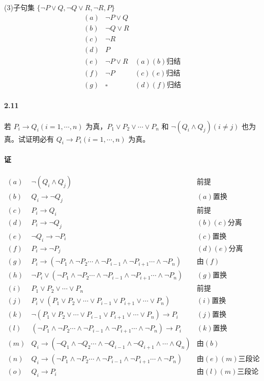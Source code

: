 \documentclass[hyperref, UTF8]{ctexart}
\newcommand{\zhyou}{\text{由}}
\newcommand{\zhfenli}{\text{分离}}
\newcommand{\zhqianti}{\text{前提}}
\newcommand{\zhzhihuan}{\text{置换}}
\begin{document}
(3)子句集 $ \{  \lnot P \lor Q, \lnot Q \lor R, \lnot R, P \} $
\begin{align*}
(a) & \lnot P \lor Q \\
(b) & \lnot Q \lor R \\
(c) & \lnot R \\
(d) & P \\
(e) & \lnot P \lor R & (a)(b)\text{归结} \\
(f) & \lnot P & (c)(e)\text{归结} \\
(g) & \square & (d)(f)\text{归结} 
\end{align*}

\paragraph{2.11}\label{2.11}
若 $ P_i \rightarrow Q_i(i=1, \cdots, n) $ 为真，$ P_1 \lor P_2 \lor \cdots \lor P_n $ 和 $  \lnot (Q_i \land Q_j) (i \neq j) $ 也为真。试证明必有 $ Q_i \rightarrow P_i (i=1, \cdots, n) $ 为真。

\paragraph{证}
\begin{align*}
(a) & \lnot (Q_i \land Q_j) & \zhqianti \\
(b) & Q_i \to \lnot Q_j & (a)\zhzhihuan \\
(c) & P_i \to Q_i & \zhqianti \\ 
(d) & P_i \to \lnot Q_j & (b)(c)\zhfenli \\
(e) & \lnot Q_i \to \lnot P_i & (c)\zhzhihuan \\
(f) & P_i \to \lnot P_j & (d)(e)\zhfenli \\
(g) & P_i \to (\lnot P_1 \land \lnot P_2 \cdots \land \lnot P_{i-1} \land \lnot P_{i+1} \cdots \land \lnot P_n) & \zhyou (f) \\
(h) & \lnot P_i \lor (\lnot P_1 \land \lnot P_2 \cdots \land \lnot P_{i-1} \land \lnot P_{i+1} \cdots \land \lnot P_n) & (g)\zhzhihuan \\
(i) & P_1 \lor P_2 \lor \cdots \lor P_n & \zhqianti \\
(j) & P_i \lor (P_1 \lor P_2 \lor \cdots \lor P_{i-1} \lor P_{i+1} \lor \cdots \lor P_n) & (i)\zhzhihuan \\
(k) & \lnot (P_1 \lor P_2 \lor \cdots \lor P_{i-1} \lor P_{i+1} \lor \cdots \lor P_n) \to P_i & (j)\zhzhihuan \\
(l) & (\lnot P_1 \land \lnot P_2 \cdots \land \lnot P_{i-1} \land \lnot P_{i+1} \cdots \land \lnot P_n) \to P_i & (k)\zhzhihuan \\
(m) & Q_i \to (\lnot Q_1 \land \lnot Q_2 \cdots \land \lnot Q_{i-1} \land \lnot Q_{i+1} \land \cdots \land Q_n) & \zhyou (b) \\
(n) & Q_i \to (\lnot P_1 \land \lnot P_2 \cdots \land \lnot P_{i-1} \land \lnot P_{i+1} \cdots \land \lnot P_n) & \zhyou (e)(m)\text{三段论} \\
(o) & Q_i \to P_i & \zhyou (l)(m)\text{三段论}
\end{align*}
\end{document}
